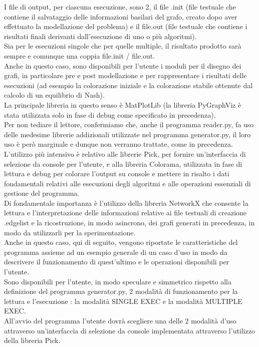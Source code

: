 I file di output, per ciascuna esecuzione, sono 2, il file .init (file testuale che contiene il salvataggio delle informazioni basilari del grafo, creato dopo aver effettuato la modellazione del problema) e il file.out (file testuale che contiene i risultati finali derivanti dall'esecuzione di uno o più algoritmi).\\

Sia per le esecuzioni singole che per quelle multiple, il risultato prodotto sarà sempre e comunque una coppia file.init / file.out.\\  

Anche in questo caso, sono disponibili per l'utente i moduli per il disegno dei grafi, in particolare pre e post modellazione e per rappresentare i risultati delle esecuzioni (ad esempio la colorazione iniziale e la colorazione stabile ottenute dal calcolo di un equilibrio di Nash).\\
La principale libreria in questo senso è MatPlotLib (la libreria PyGraphViz è stata utilizzata solo in fase di debug come specificato in precedenza).\\

Per non tediare il lettore, confermiamo che, anche il programma reader.py, fa uso delle medesime librerie addizionali utilizzate nel programma generator.py, il loro uso è però marginale e dunque non verranno trattate, come in precedenza.\\
L'utilizzo più intensivo è relativo alle librerie Pick, per fornire un'interfaccia di selezione da console per l'utente, e alla libreria Colorama, utilizzata in fase di lettura e debug per colorare l'output su console e mettere in risalto i dati fondamentali relativi alle esecuzioni degli algoritmi e alle operazioni essenziali di gestione del programma.\\

Di fondamentale importanza è l'utilizzo della libreria NetworkX che consente la lettura e l'interpretazione delle informazioni relative ai file testuali di creazione .edgelist e la ricostruzione, in modo asincrono, dei grafi generati in precedenza, in modo da utilizzarli per la sperimentazione.\\

Anche in questo caso, qui di seguito, vengono riportate le caratteristiche del programma assieme ad un esempio generale di un caso d'uso in modo da descrivere il funzionamento di quest'ultimo e le operazioni disponibili per l'utente.\\

Sono disponibili per l'utente, in modo speculare e simmetrico rispetto alla definizione del programma generator.py, 2 modalità di funzionamento per la lettura e l'esecuzione : la modalità SINGLE EXEC e la modalità MULTIPLE EXEC.\\
All'avvio del programma l'utente dovrà scegliere una delle 2 modalità d'uso attraverso un'interfaccia di selezione da console implementata attraverso l'utilizzo della libreria Pick.\\


